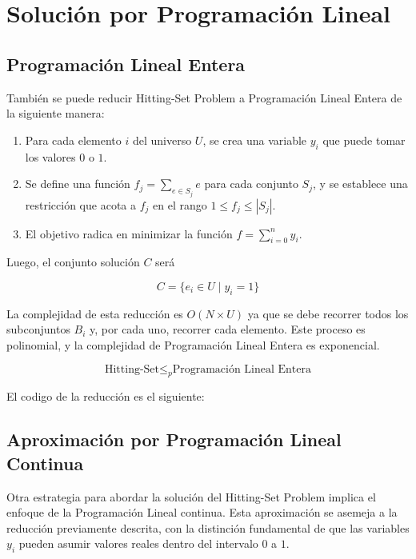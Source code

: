 \section{Solución por Programación Lineal}

\subsection{Programación Lineal Entera}

También se puede reducir Hitting-Set Problem a Programación Lineal Entera de la siguiente manera:

\begin{enumerate}

    \item Para cada elemento $i$ del universo $U$, se crea una variable $y_{i}$ que puede tomar los valores $0$ o $1$.
    
    \item Se define una función \(f_{j} = \sum_{e \in S_j} e\) para cada conjunto \(S_{j}\), y se establece una restricción que acota a \(f_{j}\) en el rango \(1 \leq f_{j} \leq |S_{j}|\).


    \item  El objetivo radica en minimizar la función $f=\sum_{i=0}^{n}y_{i}$.

\end{enumerate}

Luego, el conjunto solución $C$ será

\[
    C = \{e_i \in U \mid y_{i} = 1\}
\]

La complejidad de esta reducción es $O(N \times U)$ ya que se debe recorrer todos los subconjuntos $B_i$ y, por cada uno, recorrer cada elemento. Este proceso es polinomial, y la complejidad de Programación Lineal Entera es exponencial.

\[\text{Hitting-Set}  \leq _{p} \text{Programación Lineal Entera}\]

El codigo de la reducción es el siguiente:



\subsection{Aproximación por Programación Lineal Continua}

Otra estrategia para abordar la solución del Hitting-Set Problem implica el enfoque de la Programación Lineal continua. Esta aproximación se asemeja a la reducción previamente descrita, con la distinción fundamental de que las variables 
$y_i$ pueden asumir valores reales dentro del intervalo $0$ a $1$.

